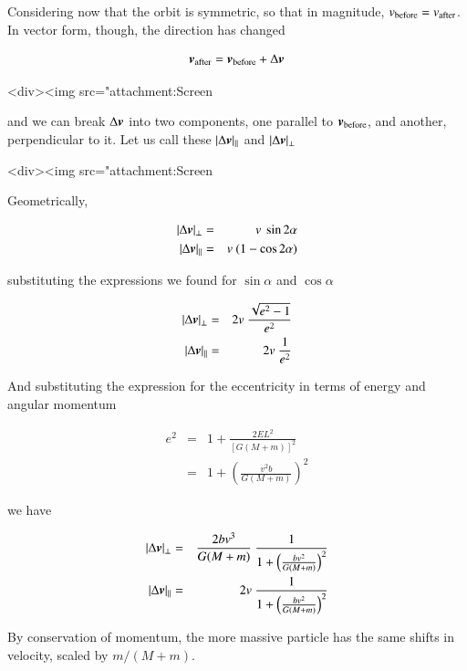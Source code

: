 Considering now that the orbit is symmetric, so that in magnitude, $v_{\rm before} = v_{\rm after}$. In vector form, though, the direction has changed


\begin{equation}
{\boldsymbol{v}}_{\rm after} = {\boldsymbol{v}}_{\rm before} + \Delta{\boldsymbol{v}}  
\end{equation}

<div><img src="attachment:Screen%


and we can break $\Delta{\boldsymbol{v}}$ into two components, one parallel to ${\boldsymbol{v}}_{\rm before}$, and another, perpendicular to it. Let us call these $|\Delta {\boldsymbol{v}}|_{||}$ and $|\Delta {\boldsymbol{v}}|_\perp$


<div><img src="attachment:Screen%


Geometrically, 

\begin{eqnarray}
|\Delta {\boldsymbol{v}}|_\perp &=& v \ \sin 2\alpha\\
|\Delta {\boldsymbol{v}}|_{||} &=& v \ (1-\cos 2\alpha)
\end{eqnarray}


substituting the expressions we found for $\sin\alpha$ and $\cos\alpha$


\begin{eqnarray}
|\Delta {\boldsymbol{v}}|_\perp &=& 2v \ \frac{\sqrt{e^2-1}}{e^2}\\
|\Delta {\boldsymbol{v}}|_{||} &=& 2v \ \frac{1}{e^2}
\end{eqnarray}

And substituting the expression for the eccentricity in terms of energy and angular momentum

\begin{eqnarray}
e^2 &=& 1 + \frac{2EL^2}{[G(M+m)]^2} \\
    &=& 1 + \left(\frac{v^2b}{G(M+m)}\right)^2
\end{eqnarray}


we have 

\begin{eqnarray}
|\Delta \v{v}|_\perp &=& \frac{2bv^3}{G(M+m)} \ \frac{1}{1+  \left(\frac{bv^2}{G(M+m)}\right)^2       }\\
|\Delta \v{v}|_{||} &=& 2v \ \frac{1}{ 1+  \left(\frac{bv^2}{G(M+m)}\right)^2   }
\end{eqnarray}

By conservation of momentum, the more massive particle has the same shifts in velocity, scaled by $m/(M+m)$. 


